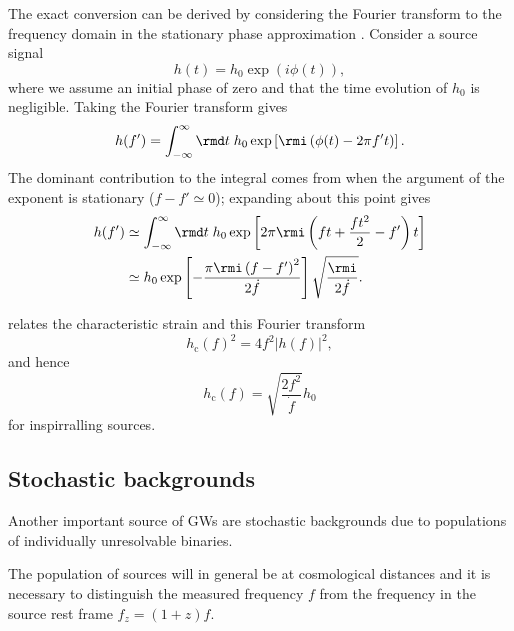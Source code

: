 \documentclass[fleqn,12pt]{iopart}
\newcommand{\sub}[1]{\ensuremath{_\mathrm{#1}}}
\begin{document}
The exact conversion can be derived by considering the Fourier transform to the frequency domain in the stationary phase approximation \citep{Finn2000}. Consider a source signal
\begin{equation}
h(t)= h_{0}\exp\left(i \phi(t)\right),
\end{equation}
where we assume an initial phase of zero and that the time evolution of $h_0$ is negligible. Taking the Fourier transform gives
\begin{equation} 
h(f') = \int_{-\infty}^{\infty}\rmd t\; h_0 \exp\left[\rmi \left(\phi(t) - 2\pi f' t\right)\right].
\end{equation}
The dominant contribution to the integral comes from when the argument of the exponent is stationary ($f - f' \simeq 0$); expanding about this point gives
\begin{eqnarray}
h(f') & \simeq \int_{-\infty}^{\infty}\rmd t\; h_0 \exp\left[2\pi \rmi \left(f t + \frac{ft^2}{2} - f' \right)t\right] \nonumber \\
 & \simeq h_{0} \exp\left[-\frac{\pi \rmi\left(f-f'\right)^2}{2\dot{f}}\right]\sqrt{\frac{\rmi}{2 \dot{f}}}.
\end{eqnarray}

 relates the characteristic strain and this Fourier transform
\begin{equation}\label{eq:FT}
h\sub{c}(f)^{2} = 4f^{2}\left| h(f) \right|^{2},
\end{equation} 
and hence
\begin{equation}
h\sub{c}(f) = \sqrt{\frac{2f^{2}}{\dot{f}}}h_{0}
\end{equation}
for inspirralling sources.

\subsection{Stochastic backgrounds}

Another important source of GWs are stochastic backgrounds due to populations of individually unresolvable binaries.

The population of sources will in general be at cosmological distances and it is necessary to distinguish the measured frequency $f$ from the frequency in the source rest frame $f_{z} = (1+z)f$.
\end{document}
